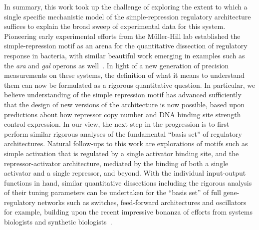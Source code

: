 In summary, this work took up the challenge of exploring the extent to which a
single specific mechanistic model of the simple-repression regulatory
architecture suffices to explain the broad sweep of experimental data for this
system. Pioneering early experimental efforts from the M\"{u}ller-Hill lab
established the simple-repression motif as an arena for the quantitative
dissection of regulatory response in bacteria, with similar beautiful work
emerging in examples such as the \textit{ara} and \textit{gal} operons as
well~\cite{Dunn1984b, Oehler1990, Weickert1993, Oehler1994, Schleif2000,
Semsey2002, SwintKruse2009}. In light of a new generation of precision
measurements on these systems, the definition of what it means to understand
them can now be formulated as a rigorous quantitative question. In particular,
we believe understanding of the simple repression motif has 
advanced sufficiently that the design of new
versions of the architecture is now possible,
based upon predictions about how repressor copy
number and DNA binding site strength control expression. In our view, the next
step in the progression is to first perform similar rigorous analyses of the
fundamental ``basis set'' of regulatory architectures. Natural follow-ups to this
work are explorations of motifs such as simple activation that is
regulated by a single activator binding site, and the repressor-activator
architecture, mediated by the binding of both a single activator and a single
repressor, and beyond. With the individual input-output functions in hand,
similar quantitative dissections including the rigorous analysis of their tuning
parameters can be undertaken for the ``basis set'' of full gene-regulatory
networks such as switches, feed-forward architectures and oscillators for
example, building upon the recent impressive bonanza of efforts from systems
biologists and synthetic biologists~\cite{Milo2002, Alon2007}.